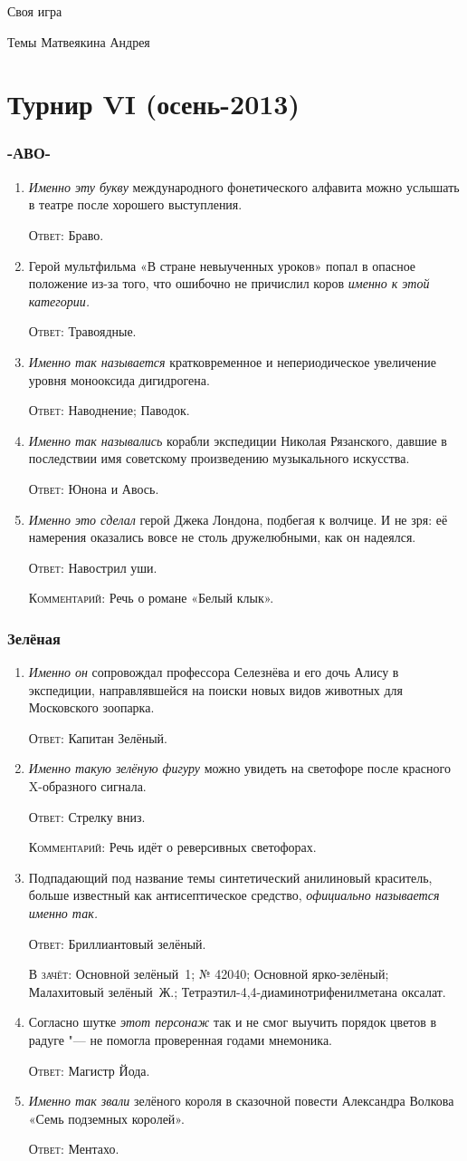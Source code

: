 \documentclass[a4paper,10pt]{article}
\let\keyword\textsc
\newenvironment{topic}{\begin{enumerate}}{\end{enumerate}}
\newcommand{\question}[3]{\item[#1.] #2 \par \keyword{Ответ:} #3}
\newcommand{\alternative}[1]{\par \keyword{В зачёт:} #1}
\newcommand{\commentary}[1]{\par \keyword{Комментарий:} #1}
\begin{document}
\begin{center}
 \Huge Своя игра
 \medskip

 \Large Темы Матвеякина Андрея
\end{center}
\bigskip


\tableofcontents



\newpage
\part{Турнир VI (осень-2013)}

\section{-АВО-}

\begin{topic}
 \question{10}{\emph{Именно эту букву} международного фонетического алфавита можно услышать в театре после хорошего выступления.}{Браво.}
 \question{20}{Герой мультфильма «В стране невыученных уроков» попал в опасное положение из-за того, что ошибочно не причислил коров \emph{именно к этой категории.}}{Травоядные.}
 \question{30}{\emph{Именно так называется} кратковременное и непериодическое увеличение уровня монооксида дигидрогена.}{Наводнение; Паводок.}
 \question{40}{\emph{Именно так назывались} корабли экспедиции Николая Рязанского, давшие в последствии имя советскому произведению музыкального искусства.}{Юнона и Авось.}
 \question{50}{\emph{Именно это сделал} герой Джека Лондона, подбегая к волчице. И не зря: её намерения оказались вовсе не столь дружелюбными, как он надеялся.}{Навострил уши.}\commentary{Речь о романе «Белый клык».}
\end{topic}


\section{Зелёная}

\begin{topic}
 \question{10}{\emph{Именно он} сопровождал профессора Селезнёва и его дочь Алису в экспедиции, направлявшейся на поиски новых видов животных для Московского зоопарка.}{Капитан Зелёный.}
 \question{20}{\emph{Именно такую зелёную фигуру} можно увидеть на светофоре после красного X-образного сигнала.}{Стрелку вниз.}\commentary{Речь идёт о реверсивных светофорах.}
 \question{30}{Подпадающий под название темы синтетический анилиновый краситель, больше известный как антисептическое средство, \emph{официально называется именно так.}}{Бриллиантовый зелёный.}\alternative{Основной зелёный~1; № 42040; Основной ярко-зелёный; Малахитовый зелёный~Ж.; Тетраэтил-4,4-диаминотрифенилметана оксалат.}
 \question{40}{Согласно шутке \emph{этот персонаж} так и не смог выучить порядок цветов в радуге "--- не помогла проверенная годами мнемоника.}{Магистр Йода.}
 \question{50}{\emph{Именно так звали} зелёного короля в сказочной повести Александра Волкова «Семь подземных королей».}{Ментахо.}
\end{topic}
\end{document}
